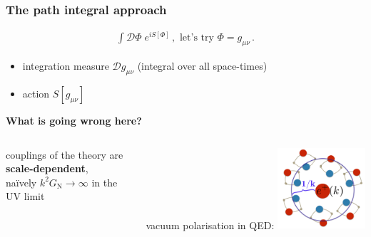 \documentclass[]{beamer}  %
\newcommand\GNewton{ G_{\scriptscriptstyle{\mathrm{N}}}{} }
\newcommand\metric{ g_{\mu\nu} }
\begin{document}
\addtocounter{framenumber}{-1}
\begin{frame}
  \frametitle{The path integral approach}

  \begin{align*}
    \boxed{
    \int \mathcal D \Phi \; e^{i S[\Phi]}\,,
    \text{ let's try } \Phi = \metric \,.
    }
  \end{align*}
  \vfill

  \begin{itemize}
    \item integration measure $\mathcal D \metric$ (integral over all space-times)
    \item action $S[\metric]$
  \end{itemize}
  \vfill
  \begin{center}
    \fontsize{12pt}{7.2}\selectfont
    \textbf{ What is going wrong here? }
  \end{center}
  \begin{columns}[T]
    \begin{column}{.5\textwidth}
      \begin{center}
        couplings of the theory are \textbf{scale-dependent},\\[10pt]
        na\"ively $k^2 \GNewton \rightarrow \infty$ in the UV limit
      \end{center}
    \end{column}
    \begin{column}{.5\textwidth}
      \begin{center}
        vacuum polarisation in QED:
        \includegraphics[width=0.4\textwidth]{screening.png}
      \end{center}
    \end{column}
  \end{columns}
\end{frame}


\end{document}
